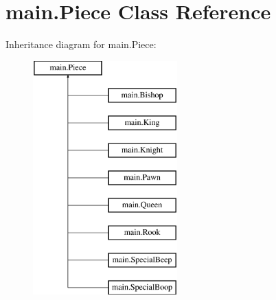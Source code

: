 \hypertarget{classmain_1_1_piece}{}\section{main.\+Piece Class Reference}
\label{classmain_1_1_piece}
Inheritance diagram for main.\+Piece\+:\begin{figure}[H]
\begin{center}
\leavevmode
\includegraphics[height=9.000000cm]{classmain_1_1_piece}
\end{center}
\end{figure}
